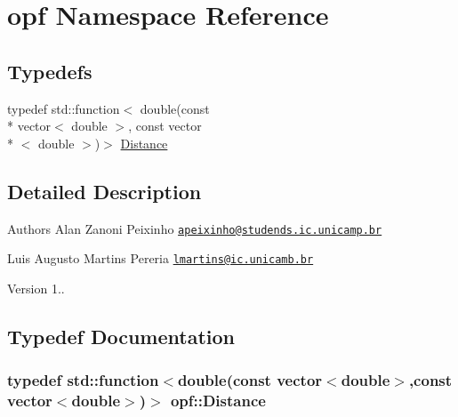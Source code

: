 \hypertarget{namespaceopf}{\section{opf Namespace Reference}
\label{namespaceopf}
}
\subsection*{Typedefs}
\begin{DoxyCompactItemize}
\item 
typedef std\+::function$<$ double(const \\*
vector$<$ double $>$, const vector\\*
$<$ double $>$)$>$ \hyperlink{namespaceopf_a61631393754e0aa6aaeacf0767b2b419}{Distance}
\end{DoxyCompactItemize}


\subsection{Detailed Description}
\begin{DoxyAuthor}{Authors}
Alan Zanoni Peixinho \href{mailto:apeixinho@studends.ic.unicamp.br}{\tt apeixinho@studends.\+ic.\+unicamp.\+br} 

Luis Augusto Martins Pereria \href{mailto:lmartins@ic.unicamb.br}{\tt lmartins@ic.\+unicamb.\+br} 
\end{DoxyAuthor}
\begin{DoxyVersion}{Version}
1.. 
\end{DoxyVersion}


\subsection{Typedef Documentation}
\hypertarget{namespaceopf_a61631393754e0aa6aaeacf0767b2b419}{
\subsubsection[{Distance}]{\setlength{\rightskip}{0pt plus 5cm}typedef std\+::function$<$double(const vector$<$double$>$,const vector$<$double$>$)$>$ {\bf opf\+::\+Distance}}}\label{namespaceopf_a61631393754e0aa6aaeacf0767b2b419}

